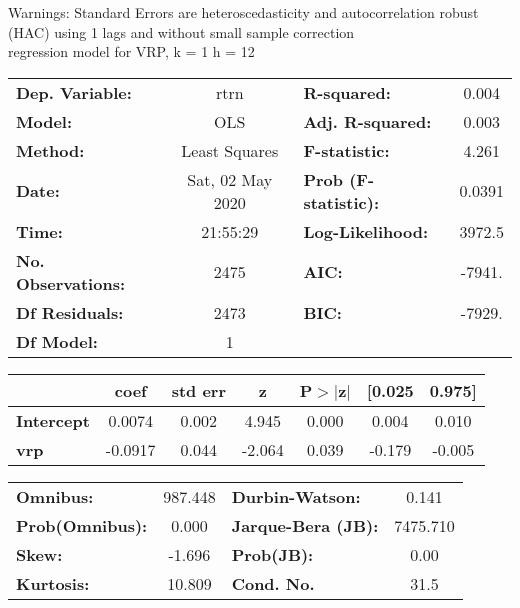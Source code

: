 Warnings: \newline
 [1] Standard Errors are heteroscedasticity and autocorrelation robust (HAC) using 1 lags and without small sample correction\\ 

regression model for VRP, k = 1 h = 12\begin{center}
\begin{tabular}{lclc}
\toprule
\textbf{Dep. Variable:}    &       rtrn       & \textbf{  R-squared:         } &     0.004   \\
\textbf{Model:}            &       OLS        & \textbf{  Adj. R-squared:    } &     0.003   \\
\textbf{Method:}           &  Least Squares   & \textbf{  F-statistic:       } &     4.261   \\
\textbf{Date:}             & Sat, 02 May 2020 & \textbf{  Prob (F-statistic):} &   0.0391    \\
\textbf{Time:}             &     21:55:29     & \textbf{  Log-Likelihood:    } &    3972.5   \\
\textbf{No. Observations:} &        2475      & \textbf{  AIC:               } &    -7941.   \\
\textbf{Df Residuals:}     &        2473      & \textbf{  BIC:               } &    -7929.   \\
\textbf{Df Model:}         &           1      & \textbf{                     } &             \\
\bottomrule
\end{tabular}
\begin{tabular}{lcccccc}
                   & \textbf{coef} & \textbf{std err} & \textbf{z} & \textbf{P$> |$z$|$} & \textbf{[0.025} & \textbf{0.975]}  \\
\midrule
\textbf{Intercept} &       0.0074  &        0.002     &     4.945  &         0.000        &        0.004    &        0.010     \\
\textbf{vrp}       &      -0.0917  &        0.044     &    -2.064  &         0.039        &       -0.179    &       -0.005     \\
\bottomrule
\end{tabular}
\begin{tabular}{lclc}
\textbf{Omnibus:}       & 987.448 & \textbf{  Durbin-Watson:     } &    0.141  \\
\textbf{Prob(Omnibus):} &   0.000 & \textbf{  Jarque-Bera (JB):  } & 7475.710  \\
\textbf{Skew:}          &  -1.696 & \textbf{  Prob(JB):          } &     0.00  \\
\textbf{Kurtosis:}      &  10.809 & \textbf{  Cond. No.          } &     31.5  \\
\bottomrule
\end{tabular}
\end{center}

